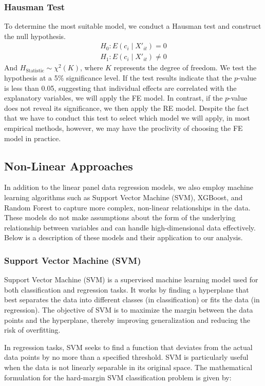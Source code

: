 \documentclass{article}
\begin{document}
\subsubsection{Hausman Test}
To determine the most suitable model, we conduct a Hausman test and construct the null hypothesis.
\begin{align*}
    H_0: E(c_i \mid X'_{it}) = 0 \\
    H_1: E(c_i \mid X'_{it}) \neq 0
\end{align*} 
And \( H_{\text{Statistic}} \sim \chi^2(K) \), where \( K \) represents the degree of freedom.
We test the hypothesis at a 5\% significance level.
If the test results indicate that the \( p \)-value is less than 0.05, suggesting that individual effects are correlated with the explanatory variables, we will apply the FE model.
In contrast, if the \( p \)-value does not reveal its significance, we then apply the RE model.
Despite the fact that we have to conduct this test to select which model we will apply, in most empirical methods, however, we may have the proclivity of choosing the FE model in practice.

\subsection{Non-Linear Approaches}
In addition to the linear panel data regression models, we also employ machine learning algorithms such as Support Vector Machine (SVM), XGBoost, and Random Forest to capture more complex, non-linear relationships in the data. These models do not make assumptions about the form of the underlying relationship between variables and can handle high-dimensional data effectively. Below is a description of these models and their application to our analysis.

\subsubsection{Support Vector Machine (SVM)}
Support Vector Machine (SVM) is a supervised machine learning model used for both classification and regression tasks. It works by finding a hyperplane that best separates the data into different classes (in classification) or fits the data (in regression). The objective of SVM is to maximize the margin between the data points and the hyperplane, thereby improving generalization and reducing the risk of overfitting.

In regression tasks, SVM seeks to find a function that deviates from the actual data points by no more than a specified threshold. SVM is particularly useful when the data is not linearly separable in its original space. The mathematical formulation for the hard-margin SVM classification problem is given by:
\end{document}
